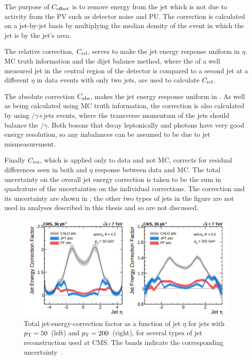 The purpose of $C_{\rm{offset}}$ is to remove energy from the jet which is not due to activity from the \ac{PV} such as detector noise and \ac{PU}. The correction is calculated on a jet-by-jet basis by multiplying the median \pt density of the event in which the jet is by the jet's area. 

The relative correction, $C_{\rm{rel}}$, serves to make the jet energy response uniform in $\eta$. \ac{MC} truth information and the dijet \pt balance method, where the \pt of a well measured jet in the central region of the detector is compared to a second jet at a different $\eta$ in data events with only two jets, are used to calculate $C_{\rm{rel}}$.

The absolute correction $C_{\rm{abs}}$, makes the jet energy response uniform in \pt. As well as being calculated using \ac{MC} truth information, the correction is also calculated by using \PZ$/\gamma$+jets events, where the transverse momentum of the jets should balance the \PZ$/\gamma$. Both \PZ bosons that decay leptonically and photons have very good energy resolution, so any imbalances can be assumed to be due to jet mismeasurement.

Finally $C_{\rm{res}}$, which is applied only to data and not \ac{MC}, corrects for residual differences seen in both \pt and $\eta$ response between data and \ac{MC}. The total uncertainty on the overall jet energy correction is taken to be the sum in quadrature of the uncertainties on the individual corrections. The correction and its uncertainty are shown in ; the other two types of jets in the figure are not used in analyses described in this thesis and so are not discussed.

\begin{figure}
  \includegraphics[width=1.2\largefigwidth]{plots/obj/jec.png}
  \caption[Total jet-energy-correction factor as a function of jet $\eta$ for jets with $\pt=50$\GeV\, (left) and $\pt=200$\GeV\, (right), for several types of jet reconstruction used at CMS. The bands indicate the corresponding uncertainty.]{Total jet-energy-correction factor as a function of jet $\eta$ for jets with $\pt=50$\GeV\, (left) and $\pt=200$\GeV\, (right), for several types of jet reconstruction used at CMS. The bands indicate the corresponding uncertainty~\cite{CMS-JME-10-011}.}
  \label{fig:jec}
\end{figure}
